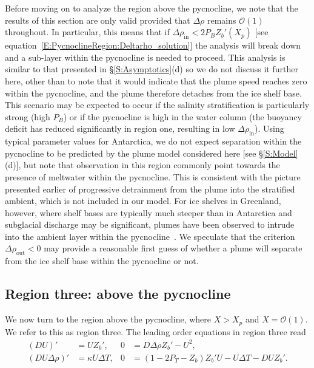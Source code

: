 \documentclass[openacc]{rsproca_new}%
\newcommand{\order}[1]{\mathcal{O}(#1)}
\newcommand{\Pb}{\textit{P}_B}  %
\newcommand{\Pt}{\textit{P}_T}
\renewcommand{\in}{\text{in}} %
\newcommand{\out}{\text{out}}
\begin{document}
Before moving on to analyze the  region above the pycnocline, we note that the results of this section are only valid provided that $\Delta \rho$ remains $\order{1}$ throughout. In particular, this means that if $\Delta \rho_{\in} < 2 \Pb Z_b'(X_p)$ [see equation~\eqref{E:PycnoclineRegion:Deltarho_solution}] the analysis will break down and a sub-layer within the pycnocline is needed to proceed. This analysis is similar to that presented in \S\ref{S:Asymptotics}(d) so we do not discuss it further here, other than to note that it would indicate that the plume speed reaches zero within the pycnocline, and the plume therefore detaches from the ice shelf base. This scenario may be expected to occur if the salinity stratification is particularly strong (high $\Pb$) or if the pycnocline is high in the water column (the buoyancy deficit has reduced significantly in region one, resulting in low $\Delta \rho_{\in}$). Using typical parameter values for Antarctica, we do not expect separation within the pycnocline to be predicted by the plume model considered here [see \S\ref{S:Model}(d)], but note that observation in this region commonly point towards the presence of meltwater within the pycnocline. This is consistent with the picture presented earlier of progressive detrainment from the plume into the stratified ambient, which is not included in our model. For ice shelves in Greenland, however, where shelf bases are typically much steeper than in Antarctica and subglacial discharge may be significant, plumes have been observed to intrude into the ambient layer within the pycnocline~\cite{Straneo2011NatureGeo}. We speculate that the criterion $\Delta \rho_\out < 0$ may provide a reasonable first guess of whether a plume will separate from the ice shelf base within the pycnocline or not.

\subsection{Region three: above the pycnocline}\label{S:Asymptotics:Region3}
We now turn to the region above the pycnocline,  where $X > X_p$ and $X = \order{1}$. We refer to this as region three. The leading order equations in region three read
\begin{align}
 (DU)' &= U Z_b', &
0 &= D \Delta \rho Z_b' - U^2, \label{E:Region3:mass}\\
(DU\Delta \rho)'  &=\kappa U \Delta T, &
0&= (1  - 2\Pt -  Z_b)Z_b'U- U\Delta T - DU Z_b'.\label{E:Region3:thermal}
\end{align}
\end{document}
